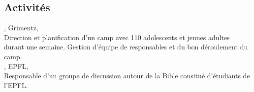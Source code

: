\documentclass[mm, 11pt]{simple_style}
\begin{document}
\begin{resume}
\section{Activit\'es}
, Grimentz, \\
Direction et planification d'un camp avec 110 adolescents et jeunes adultes durant une semaine. Gestion d'\'equipe de responsables et du bon d\'eroulement du camp.\\
, EPFL, \\
Responsable d'un groupe de discussion autour de la Bible consitu\'e d'\'etudiants de l'EPFL.


\end{resume}
\end{document}
